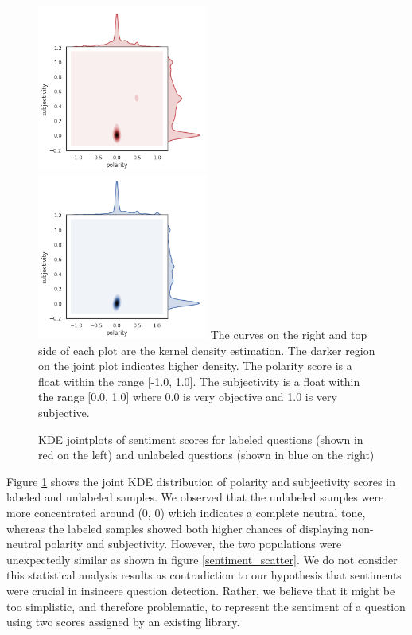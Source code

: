 \documentclass[12pt]{diazessay} %
\begin{document}
\begin{figure}[!htbp]
    \includegraphics[width=0.5\textwidth]{graphs/labeled_sentiment_jointplot.png}
    \includegraphics[width=0.5\textwidth]{graphs/unlabeled_sentiment_jointplot.png}
    \medskip
    \small
    The curves on the right and top side of each plot are the kernel density estimation. The darker region on the joint plot indicates higher density. The polarity score is a float within the range [-1.0, 1.0]. The subjectivity is a float within the range [0.0, 1.0] where 0.0 is very objective and 1.0 is very subjective.

    \caption{KDE jointplots of sentiment scores for labeled questions (shown in red on the left) and unlabeled questions (shown in blue on the right)}
    \label{figure:sentiment_jointplot}
\end{figure}

Figure \ref{figure:sentiment_jointplot} shows the joint KDE distribution of polarity and subjectivity scores in labeled and unlabeled samples. We observed that the unlabeled samples were more concentrated around (0, 0) which indicates a complete neutral tone, whereas the labeled samples showed both higher chances of displaying non-neutral polarity and subjectivity. However, the two populations were unexpectedly similar as shown in figure \ref{sentiment_scatter}. We do not consider this statistical analysis results as contradiction to our hypothesis that sentiments were crucial in insincere question detection. Rather, we believe that it might be too simplistic, and therefore problematic, to represent the sentiment of a question using two scores assigned by an existing library. 
\end{document}
